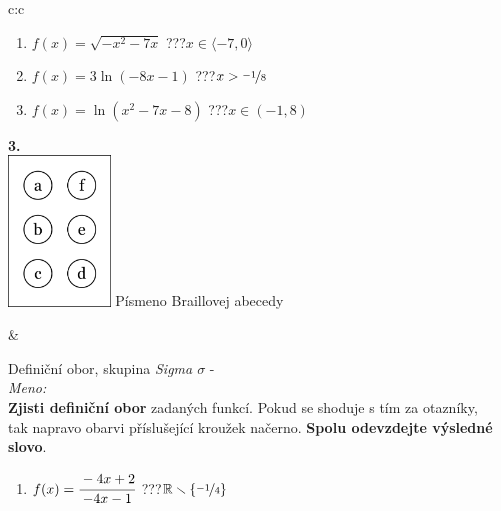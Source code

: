 \documentclass[10pt]{report}
\begin{document}
\begin{tabular}{c:c}
\begin{minipage}[c][99mm][t]{0.49\linewidth}
\begin{center}
\begin{minipage}{0.77\linewidth}
\begin{center}
\begin{varwidth}{\textwidth}
\begin{enumerate}
\item $f(x)=\sqrt{-x^2-7x}$\quad \dotfill\; ???\;\dotfill \quad $x\in\langle-7 , 0\rangle$
\item $f(x)=3\ln{(-8x-1)}$\quad \dotfill\; ???\;\dotfill \quad $x>\nicefrac{-1}{8}$
\item $f(x)=\ln{(x^2-7x-8)}$\quad \dotfill\; ???\;\dotfill \quad $x\in(-1 , 8)$
\end{enumerate}
\end{varwidth}
\end{center}
\end{minipage}
\begin{minipage}{0.20\linewidth}
\begin{center}
{\Huge\bfseries 3.} \\[2mm]
\includegraphics[height=40mm]{../images/braille.png}
{\small Písmeno Braillovej abecedy}
\end{center}
\end{minipage}
\end{center}
\end{minipage}
&
\begin{minipage}[c][99mm][t]{0.49\linewidth}
\begin{center}
\vspace{7mm}
{\huge Definiční obor, skupina \textit{Sigma $\sigma$} -}\\[4.5mm]
\textit{Meno:}\phantom{xxxxxxxxxxxxxxxxxxxxxxxxxxxxxxxxxxxxxxxxxxxxxxxxxxxxxxxxxxxxxxxxx}\\[3.5mm]
\textbf{Zjisti definiční obor} zadaných funkcí. Pokud se shoduje s tím za otazníky,\\tak napravo obarvi příslušející kroužek načerno. \textbf{Spolu odevzdejte výsledné slovo}.\\[3mm]
\begin{minipage}{0.77\linewidth}
\begin{center}
\begin{varwidth}{\textwidth}
\begin{enumerate}
\normalsize
\item $f(x)=\cfrac{-4x+2}{-4x-1}$\quad \dotfill\; ???\;\dotfill \quad $\mathbb{R}\smallsetminus\{\nicefrac{-1}{4}\}$

\end{enumerate}
\end{varwidth}
\end{center}
\end{minipage}
\end{center}
\end{minipage}
\end{tabular}
\end{document}
